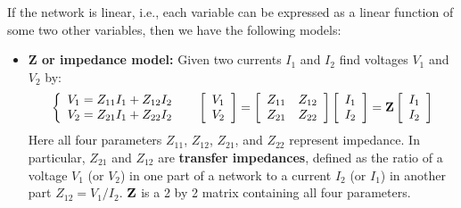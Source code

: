 \documentclass{article}
\begin{document}

If the network is linear, i.e., each variable can be expressed as a linear
function of some two other variables, then we have the following models:

\begin{itemize}
\item {\bf Z or impedance model:} Given two currents $I_1$ and $I_2$ 
  find voltages $V_1$ and $V_2$ by:
  \begin{equation} 
    \left\{ \begin{array}{l} V_1=Z_{11}I_1+Z_{12}I_2 \\
      V_2=Z_{21}I_1+Z_{22}I_2 \end{array} \right.\;\;\;\;\;
    \left[ \begin{array}{l} V_1 \\ V_2\end{array} \right]=
    \left[ \begin{array}{ll} Z_{11} & Z_{12}\\Z_{21} & Z_{22}\end{array}\right]
    \left[ \begin{array}{l} I_1 \\ I_2\end{array} \right]
    ={\bf Z}\left[ \begin{array}{l} I_1 \\ I_2\end{array} \right] 
  \end{equation}
  Here all four parameters $Z_{11}$, $Z_{12}$, $Z_{21}$, and $Z_{22}$ represent
  impedance. In particular, $Z_{21}$ and $Z_{12}$ are {\bf transfer impedances}, 
  defined as the ratio of a voltage $V_1$ (or $V_2$) in one part of a network to 
  a current $I_2$ (or $I_1$) in another part $Z_{12}=V_1/I_2$. ${\bf Z}$ is a 2 
  by 2 matrix containing all four parameters.


\end{itemize}
\end{document}
